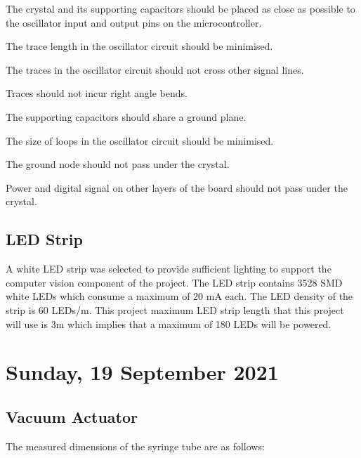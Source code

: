\begin{compactitem}
	\item The crystal and its supporting capacitors should be placed as close as possible to the oscillator input and output pins on the microcontroller.
	\item The trace length in the oscillator circuit should be minimised.
	\item The traces in the oscillator circuit should not cross other signal lines.
	\item Traces should not incur right angle bends.
	\item The supporting capacitors should share a ground plane.
	\item The size of loops in the oscillator circuit should be minimised.
	\item The ground node should not pass under the crystal.
	\item Power and digital signal on other layers of the board should not pass under the crystal. 
\end{compactitem}

\subsection{LED Strip}

A white \ac{LED} strip was selected to provide sufficient lighting to support the computer vision component of the project. The \ac{LED} strip contains 3528 \ac{SMD} white LEDs which consume a maximum of 20 mA each. The \ac{LED} density of the strip is 60 LEDs/m. This project maximum LED strip length that this project will use is 3m which implies that a maximum of 180 LEDs will be powered. 

\pendsign

\section[2021/09/19]{Sunday, 19 September 2021}

\subsection{Vacuum Actuator}

The measured dimensions of the syringe tube are as follows:

